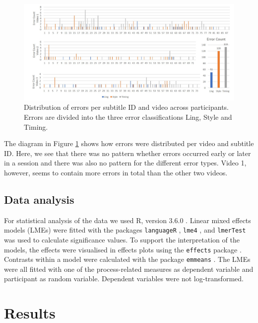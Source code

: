 \documentclass[output=paper]{langscibook}
\begin{document}
\begin{figure}
\includegraphics[width=1\textwidth]{figures/ErrorDistribution.jpg}
%
\caption{Distribution of errors per subtitle ID and video across participants.
Errors are divided into the three error classifications Ling, Style and Timing.\label{fig:2_errors}}
\end{figure}

The diagram in Figure \ref{fig:2_errors} shows how errors were distributed per video and subtitle ID.
Here, we see that there was no pattern whether errors occurred early or later in a session and there was also no pattern for the different error types.
Video 1, however, seems to contain more errors in total than the other two videos.

\subsection{Data analysis}
For statistical analysis of the data we used R, version 3.6.0 \citep{R}.
Linear mixed effects models (LMEs) were fitted with the packages \texttt{languageR} \citep{baayen2019package}, \texttt{lme4} \citep{Bates2015lme4}, and \texttt{lmerTest} \citep{Kuznetova2017lmerTest} was used to calculate significance values.
To support the interpretation of the models, the effects were visualised in effects plots using the \texttt{effects} package \citep{Fox2009effects}.
Contrasts within a model were calculated with the package \texttt{emmeans} \citep{lenth_emmeans_2019}.
The LMEs were all fitted with one of the process-related measures as dependent variable and participant as random variable.
Dependent variables were not log-transformed.

\section{Results} 
\end{document}
